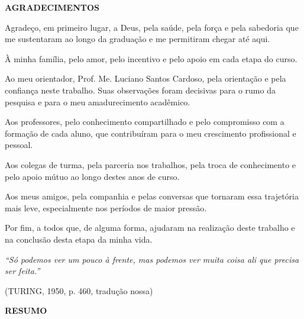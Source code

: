 \documentclass[12pt,a4paper]{extarticle}
\begin{document}
\newpage
\thispagestyle{empty}
\begin{center}
    {\Large\textbf{AGRADECIMENTOS}}
\end{center}
\vspace{1cm}

{\onehalfspacing
Agradeço, em primeiro lugar, a Deus, pela saúde, pela força e pela sabedoria que me sustentaram ao longo da graduação e me permitiram chegar até aqui.

À minha família, pelo amor, pelo incentivo e pelo apoio em cada etapa do curso.

Ao meu orientador, Prof. Me. Luciano Santos Cardoso, pela orientação e pela confiança neste trabalho. Suas observações foram decisivas para o rumo da pesquisa e para o meu amadurecimento acadêmico.

Aos professores, pelo conhecimento compartilhado e pelo compromisso com a formação de cada aluno, que contribuíram para o meu crescimento profissional e pessoal.

Aos colegas de turma, pela parceria nos trabalhos, pela troca de conhecimento e pelo apoio mútuo ao longo destes anos de curso.

Aos meus amigos, pela companhia e pelas conversas que tornaram essa trajetória mais leve, especialmente nos períodos de maior pressão.

Por fim, a todos que, de alguma forma, ajudaram na realização deste trabalho e na conclusão desta etapa da minha vida.
\par}

\newpage
\thispagestyle{empty}
\null\vfill
\begin{flushright}
\begin{minipage}{8cm}
\raggedleft
\textit{``Só podemos ver um pouco à frente, mas podemos ver muita coisa ali que precisa ser feita.''}

\vspace{0.3cm}
(TURING, 1950, p. 460, tradução nossa)
\end{minipage}
\end{flushright}

\newpage
\thispagestyle{empty}
\begin{center}
    \textbf{RESUMO}
\end{center}
\vspace{0.5cm}
\end{document}
